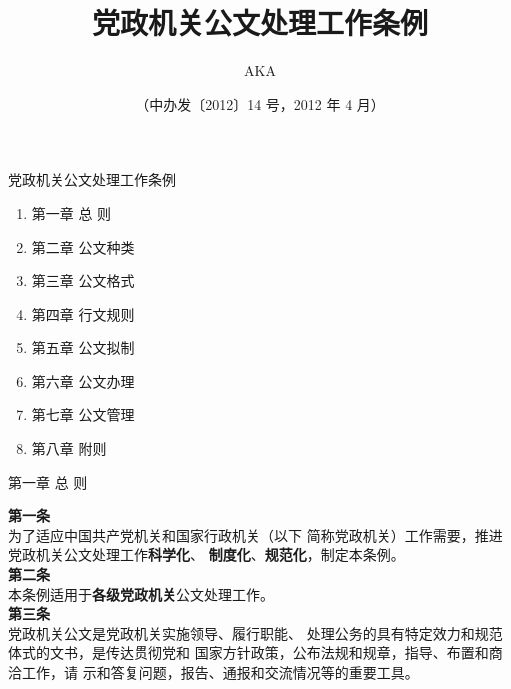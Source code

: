 \documentclass[aspectratio=169]{beamer}
\begin{document}
%
%

\title{党政机关公文处理工作条例}
\author{AKA}
\institute{}
\date{（中办发〔2012〕14 号，2012 年 4 月）}

\begin{frame}
    \titlepage
\end{frame}

\begin{frame}[t]{党政机关公文处理工作条例} \vspace{20pt}
    \begin{enumerate}
        \item {第一章 总 则}
        \item {第二章 公文种类}
        \item {第三章 公文格式}
        \item {第四章 行文规则}
        \item {第五章 公文拟制}
        \item {第六章 公文办理}
        \item {第七章 公文管理}
        \item {第八章 附则}
    \end{enumerate}
\end{frame}


    \begin{frame}[t]{第一章 总 则} \vspace{20pt}

        \textbf{第一条}\\
        为了适应中国共产党机关和国家行政机关（以下
        简称党政机关）工作需要，推进党政机关公文处理工作\textbf{科学化}、
        \textbf{制度化}、\textbf{规范化}，制定本条例。\\
        \textbf{第二条}\\
        本条例适用于\textbf{各级党政机关}公文处理工作。\\
        \textbf{第三条} \\
        党政机关公文是党政机关实施领导、履行职能、
        处理公务的具有特定效力和规范体式的文书，是传达贯彻党和
        国家方针政策，公布法规和规章，指导、布置和商洽工作，请
        示和答复问题，报告、通报和交流情况等的重要工具。\\
    \end{frame}
\end{document}

